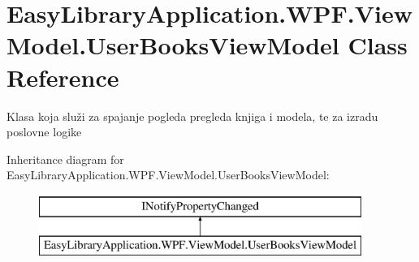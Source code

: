 \hypertarget{class_easy_library_application_1_1_w_p_f_1_1_view_model_1_1_user_books_view_model}{}\section{Easy\+Library\+Application.\+W\+P\+F.\+View\+Model.\+User\+Books\+View\+Model Class Reference}
\label{class_easy_library_application_1_1_w_p_f_1_1_view_model_1_1_user_books_view_model}


Klasa koja služi za spajanje pogleda pregleda knjiga i modela, te za izradu poslovne logike  


Inheritance diagram for Easy\+Library\+Application.\+W\+P\+F.\+View\+Model.\+User\+Books\+View\+Model\+:\begin{figure}[H]
\begin{center}
\leavevmode
\includegraphics[height=2.000000cm]{class_easy_library_application_1_1_w_p_f_1_1_view_model_1_1_user_books_view_model}
\end{center}
\end{figure}
